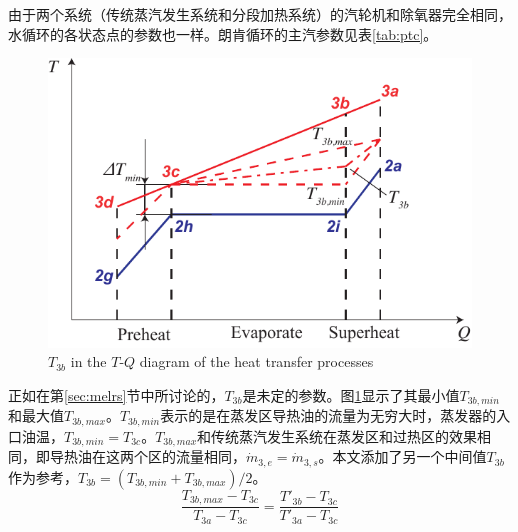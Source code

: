 由于两个系统（传统蒸汽发生系统和分段加热系统）的汽轮机和除氧器完全相同，水循环的各状态点的参数也一样。朗肯循环的主汽参数见表\ref{tab:ptc}。

\noindent \begin{figure}[htbp]
\begin{center}
	\includegraphics[width = 0.7\columnwidth]{fig/T3b}
	\caption{$T_{3b}$ in the $T$-$Q$ diagram of the heat transfer processes}
	\label{fig:T3b}
\end{center}
\end{figure}

正如在第\ref{sec:melrs}节中所讨论的，$T_{3b}$是未定的参数。图\ref{fig:T3b}显示了其最小值$T_{3b,min}$和最大值$T_{3b,max}$。$T_{3b,min}$表示的是在蒸发区导热油的流量为无穷大时，蒸发器的入口油温，$T_{3b,min} = T_{3c}$。$T_{3b,max}$和传统蒸汽发生系统在蒸发区和过热区的效果相同，即导热油在这两个区的流量相同，$\dot{m}_{3,e} = \dot{m}_{3,s}$。本文添加了另一个中间值$T_{3b}$作为参考，$T_{3b} = (T_{3b,min} + T_{3b,max}) / 2$。
\begin{equation}
  \dfrac{T_{3b,max}-T_{3c}}{T_{3a} - T_{3c}} = \dfrac{T'_{3b} - T_{3c}}{T'_{3a} - T_{3c}}
\end{equation}

